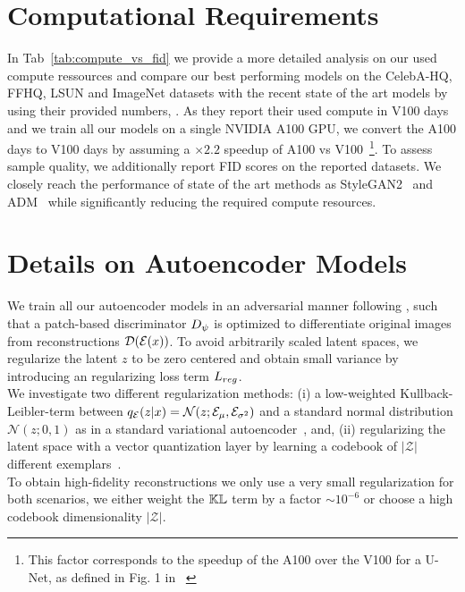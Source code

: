\documentclass[10pt,twocolumn,letterpaper]{article}
\begin{document}
\newpage
\section{Computational Requirements}
\label{suppsec:compute2}
%
%
%
%
\computevsfid
In Tab~\ref{tab:compute_vs_fid} we provide a more detailed analysis on our used compute ressources and compare our best performing models on the CelebA-HQ, FFHQ, LSUN and ImageNet datasets with the recent state of the art models by using their provided numbers, \cf \cite{DBLP:journals/corr/abs-2105-05233}.  As they report their used compute in V100 days and we train all our models on a single NVIDIA A100 GPU, we convert the A100 days to V100 days by assuming a $\times 2.2$ speedup of A100 vs V100~\cite{a100tov100}\footnote{This factor corresponds to the speedup of the A100 over the V100 for a U-Net, as defined in Fig. 1 in ~\cite{a100tov100}}. To assess sample quality, we additionally report FID scores on the reported datasets. We closely reach the performance of state of the art methods as StyleGAN2~\cite{DBLP:journals/corr/abs-1912-04958} and ADM~\cite{DBLP:journals/corr/abs-2105-05233} while significantly reducing the required compute resources.

\newpage
\section{Details on Autoencoder Models}
\label{suppsec:ae}
%
%
%
%
%
%
%
%
%
%
%
%
We train all our autoencoder models in an adversarial manner following \cite{DBLP:journals/corr/abs-2012-09841}, such that a patch-based discriminator $D_{\psi}$ is optimized to differentiate original images from reconstructions $\mathcal{D}(\mathcal{E}(x))$. 
To avoid arbitrarily scaled latent spaces, we regularize the latent $z$ to be zero centered and obtain small variance by introducing an regularizing loss term $L_{reg}$. \\
We investigate two different regularization methods: (i) a low-weighted Kullback-Leibler-term between $q_{\mathcal{E}}(z \vert x) = \mathcal{N}(z; \mathcal{E}_\mu, \mathcal{E}_{\sigma^2})$ and a standard normal distribution 
$\mathcal{N}(z; 0, 1)$ as in a standard variational autoencoder~\cite{VAE,VAE2}, and, (ii) regularizing the latent space with a vector quantization layer by learning a codebook of $\vert \mathcal{Z} \vert$ different exemplars~\cite{DBLP:conf/nips/OordVK17}. \\
%
%
To obtain high-fidelity reconstructions we only use a very small regularization for both scenarios, \ie we either weight the $\mathbb{KL}$ term
by a factor $\sim 10^{-6}$ or choose a high codebook dimensionality $\vert \mathcal{Z} \vert$.%
\end{document}
